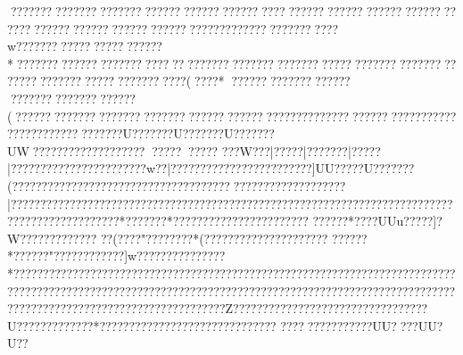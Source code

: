 {{{{{{{{{{{{{{{{{{{{{{{{{{{{{{{{{{{{{{{{{{{{{{{{{{{{{{{{{{{{{{{{{{{{{{{{{{{{{{{{{{{{{{{{{{{{{{{{{{{{{{{{{{{{{{{{{{{{{{{{{{{{{{{{{{{{{{{{{{{{{{{{{{{{{{{{{{{{{{{{{{{{{{{{{{{{{{{{{{{{{{{{{{{{{{{{{{{{{{{{{{{{{{{{{{{{{{{{{{{{{{{{{{{{{{{{{{{{{{{{{{{{{{{{{{{{{{{{{{{{{{{{{{{{{{{{{{{{{{{{{{{{{{{{{{{{{{{{{{{{{{{{{{{{{{{{{{{{{{{{{{{{{{{{{{{{{{{{{{{{{{{{{{{{{{{{{{{{{{{{{{{{{{{{{{{{{{{{{{{{{{{{{{{{{{{{{{{{{{{{{{{{{{{{{{{{{{{{{{{{{{{{{{{{{{{{{{{{{{{{{{{{{{{{{{{{{{{{{{{{{{{{{{{{{{{{{{{{{{{{{{{{{{{{{{{{{{{{{{{{{{{{{{{{{{{{{{{{{{{{{{{{{{{{{{{{{{{{{{{{{{{{{{{{{{{{{{{{{{{{{{{{{{{{{{{{{{{{{{{{{{{{{{{{{{{{{{{{{{{{{{{{{{{{{{{{{{{{{{{{{{{{{{{{{{{{{{{{{{{{{{{{{{{{{{{{{{{{{{{{{{{{{{{{{{{{{{{{{{{{{{{{{{{{{{{{{{{{{{{{{{{{{{{{{{{{{{{{{{{{{{{{{{{{{{{{{{{{{{{{{{{{{{{{{{{{{{{{{{{{{{{{{{{{{{{{{{{{{{{{{{{{{{{{{{{{{{{{{{{{{{{{{{{{{{{{{{{{{{{{{{{{{{{{{{{{{{{{{{{{{{{{{{{{{{{{{{{{{{{{{{{{{{{{{{{{{{{{{{{{{{{{{{{{{{{{{{{{{{{{{{{{{{{{{{{{{{{{{{{{{{{{{{{{{{{{{{{{{{{{{{{{{{{{{{{{{{{{{{{{{{{{{{{{{{{{{{{{{{{{{{{{{{{{{{{{{{{{{{{{{{{{{{{{{{{{{{{{{{{{{{{{{{{{{{{{{{{{{{{{{{{{{{{{{{{{{{{{{{{{{{{{{{{{{{{{{{{{{{{{{{{{{{{{{{{{{{{{{{{{{{{{{{{{{{{{{{{{{{{{{{{{{{{{{{{{{{{{{{{{{{{{{{{{{{{{{{{{{{{{{{{{{{{{{{{{{{{{{{{{{{{{{{{{{{{{{{{{{{{{{{{{{{{{{{{{{{{{{{{{{{{{{{{{{{{{{{{{{{{{{{{{{{{{{{{{{{{{{{{{{{{{{{{{{{{{{{{{{{{{{{{{{{{{{{{{{{{{{{{{{{{{{{{{{{{{{{{{{{{{{{{{{{{{{{{{{{{{{{{{{{{{{{{{{{{{{{{{{{{{{{{{{{{{{{{{{{{{{{{{{{{{{{{{{{{{{{{{{{{{{{{{{{{{{{{{{{{{{{{{{{{{{{{{{{{{{{{{{{{{{{{{{{{{{{{{{{{{{{{{{{{{{{{{{{{{{{{{{{{{{{{{{{{{{{{{{{{{{{{{{{{{{{{{{{{{{{{{{{{{{{{{{{{{{{{{{{{{{{{{{{{{{{{{{{{{{{{{{{{{{{{{{{{{{{{{{{{{{{{{{{{{{{{{{{{{{{{{{{{{{{{{{{{{{{{{{{{{{{{{{{{{{{{{{{{{{{{{{{{{{{{{{{{{{{{{{{{{{{{{{{{{{{{{{{{{{{{{{{{{{{{{{{{{{{{{{{{{{{{{{{{{{{{{{{{{{{{{{{{{{{{{{{{{{{{{{{{{{{{{{{{{{{{{{{{{{{{{{{{{{{{{{{{{{{{{{{{{{{{{{{{{{{{{{{{{{{{{{{{{{{{{{{{{{{{{{{{{{{{{{{{{{{{{{{{{{{{{{{{{{{{{{{{{{{{{{{{{{{{{{{{{{{{{{{{{{{{{{{{{{{{{{{{{{{{{{{{{{{{{{{{{{{{{{{{{{{{{{{?????????????????????????????????????????????????????????????????????????????????????????????????????????????????????????w???????  ????????????????*????????????? ????????????????????????????????????????????????????????????????????????  ???????????(  ????* ?????? ?????????????
????????????????????(?????? ???????????????????????????????????????????????????????????????????????????????????U???????U???????U???????UW????????????? ????????????????  ???W???|?????|???????|?????|???????{?????{?????????{??w??|?????????{???????????????]UU?????U}???????(???????????????????????????????????{????????????{?????????|??????????????????????????????????????????????????????????????????????????????????????????????*???????*???????????????????????
??????* ????UUu?????]?W?????????????
??(???? "????????*(??????????????? ??????
??????* ??????"  ????????????]w???????????????*????????????????? ??????? ????????????????????????????????????????????????????????????????????????????????????????????????????????????????????????????????????????????????????????????????????Z?????????????????????????????????U?????????????*?????? ?????? ??????????????????   ????  ????   ????   ???UU????UU?U??  }}}}}}}}}}}}}}}}}}}}}}}}}}}}}}}}}}}}}}}}}}}}}}}}}}}}}}}}}}}}}}}}}}}}}}}}}}}}}}}}}}}}}}}}}}}}}}}}}}}}}}}}}}}}}}}}}}}}}}}}}}}}}}}}}}}}}}}}}}}}}}}}}}}}}}}}}}}}}}}}}}}}}}}}}}}}}}}}}}}}}}}}}}}}}}}}}}}}}}}}}}}}}}}}}}}}}}}}}}}}}}}}}}}}}}}}}}}}}}}}}}}}}}}}}}}}}}}}}}}}}}}}}}}}}}}}}}}}}}}}}}}}}}}}}}}}}}}}}}}}}}}}}}}}}}}}}}}}}}}}}}}}}}}}}}}}}}}}}}}}}}}}}}}}}}}}}}}}}}}}}}}}}}}}}}}}}}}}}}}}}}}}}}}}}}}}}}}}}}}}}}}}}}}}}}}}}}}}}}}}}}}}}}}}}}}}}}}}}}}}}}}}}}}}}}}}}}}}}}}}}}}}}}}}}}}}}}}}}}}}}}}}}}}}}}}}}}}}}}}}}}}}}}}}}}}}}}}}}}}}}}}}}}}}}}}}}}}}}}}}}}}}}}}}}}}}}}}}}}}}}}}}}}}}}}}}}}}}}}}}}}}}}}}}}}}}}}}}}}}}}}}}}}}}}}}}}}}}}}}}}}}}}}}}}}}}}}}}}}}}}}}}}}}}}}}}}}}}}}}}}}}}}}}}}}}}}}}}}}}}}}}}}}}}}}}}}}}}}}}}}}}}}}}}}}}}}}}}}}}}}}}}}}}}}}}}}}}}}}}}}}}}}}}}}}}}}}}}}}}}}}}}}}}}}}}}}}}}}}}}}}}}}}}}}}}}}}}}}}}}}}}}}}}}}}}}}}}}}}}}}}}}}}}}}}}}}}}}}}}}}}}}}}}}}}}}}}}}}}}}}}}}}}}}}}}}}}}}}}}}}}}}}}}}}}}}}}}}}}}}}}}}}}}}}}}}}}}}}}}}}}}}}}}}}}}}}}}}}}}}}}}}}}}}}}}}}}}}}}}}}}}}}}}}}}}}}}}}}}}}}}}}}}}}}}}}}}}}}}}}}}}}}}}}}}}}}}}}}}}}}}}}}}}}}}}}}}}}}}}}}}}}}}}}}}}}}}}}}}}}}}}}}}}}}}}}}}}}}}}}}}}}}}}}}}}}}}}}}}}}}}}}}}}}}}}}}}}}}}}}}}}}}}}}}}}}}}}}}}}}}}}}}}}}}}}}}}}}}}}}}}}}}}}}}}}}}}}}}}}}}}}}}}}}}}}}}}}}}}}}}}}}}}}}}}}}}}}}}}}}}}}}}}}}}}}}}}}}}}}}}}}}}}}}}}}}}}}}}}}}}}}}}}}}}}}}}}}}}}}}}}}}}}}}}}}}}}}}}}}}}}}}}}}}}}}}}}}}}}}}}}}}}}}}}}}}}}}}}}}}}}}}}}}}}}}}}}}}}}}}}}}}}}}}}}}}}}}}}}}}}}}}}}}}}}}}}}}}}}}}}}}}}}}}}}}}}}}}}}}}}}}}}}}}}}}}}}}}}}}}}}}}}}}}}}}}}}}}}}}}}}}}}}}}}}}}}}}}}}}}}}}}}}}}}}}}}}}}}}}}}}}}}}}}}}}}}}}}}}}}}}}}}}}}}}}}}}}}}}}}}}}}}}}}}}}}}}}}}}}}}}}}}}}}}}}}}}}}}}}}}}}}}}}}}}}}}}}}}}}}}}}}}}}}}}}}}}}}}}}}}}}}}}}}}}}}}}}}}}}}}}}}}}}}}}}}}}}}}}}}}}}}}}}}}}}}}}}}}}}}}}}}}}}}}}}}}}}}}}}}}}}}}}}}}}}}}}}}}}}}}}}}}}}}}}}}}}}}}}}}}}}}}}}}}}}}}}}}}}}}}}}}}}}}}}}}}}}}}}}}}}}}}}}}}}}}}}}}}}}}}}}}}}}}}}}}}}}}}}}}}}}}}}}}}}}}}}}}}}}}}}}}}}}}}}}}}}}}}}}}}}}}}}}}}}}}}}}}}}}}}}}}}}}}}}}}}}}}}}}}}}}}}}}}}}}}}}}}}}}}}}}
